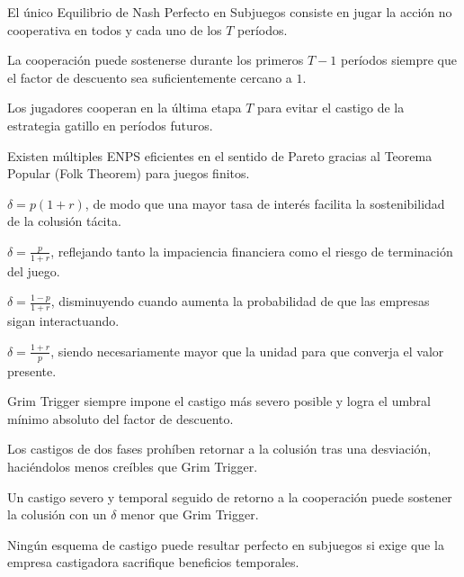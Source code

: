\begin{opts}
    \item El único Equilibrio de Nash Perfecto en Subjuegos consiste en jugar la acción no cooperativa en todos y cada uno de los $T$ períodos.
    \item La cooperación puede sostenerse durante los primeros $T-1$ períodos siempre que el factor de descuento sea suficientemente cercano a $1$.
    \item Los jugadores cooperan en la última etapa $T$ para evitar el castigo de la estrategia gatillo en períodos futuros.
    \item Existen múltiples ENPS eficientes en el sentido de Pareto gracias al Teorema Popular (Folk Theorem) para juegos finitos.
\end{opts}

\begin{opts}
    \item $\delta = p(1 + r)$, de modo que una mayor tasa de interés facilita la sostenibilidad de la colusión tácita.
    \item $\delta = \frac{p}{1 + r}$, reflejando tanto la impaciencia financiera como el riesgo de terminación del juego.
    \item $\delta = \frac{1 - p}{1 + r}$, disminuyendo cuando aumenta la probabilidad de que las empresas sigan interactuando.
    \item $\delta = \frac{1 + r}{p}$, siendo necesariamente mayor que la unidad para que converja el valor presente.
\end{opts}

\begin{opts}
    \item Grim Trigger siempre impone el castigo más severo posible y logra el umbral mínimo absoluto del factor de descuento.
    \item Los castigos de dos fases prohíben retornar a la colusión tras una desviación, haciéndolos menos creíbles que Grim Trigger.
    \item Un castigo severo y temporal seguido de retorno a la cooperación puede sostener la colusión con un $\delta$ menor que Grim Trigger.
    \item Ningún esquema de castigo puede resultar perfecto en subjuegos si exige que la empresa castigadora sacrifique beneficios temporales.
\end{opts}

